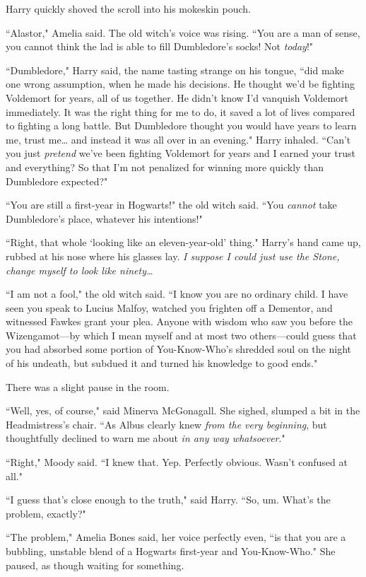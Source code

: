 Harry quickly shoved the scroll into his mokeskin pouch.

``Alastor," Amelia said. The old witch's voice was rising. ``You are a man of sense, you cannot think the lad is able to fill Dumbledore's socks! Not \emph{today}!"

``Dumbledore," Harry said, the name tasting strange on his tongue, ``did make one wrong assumption, when he made his decisions. He thought we'd be fighting Voldemort for years, all of us together. He didn't know I'd vanquish Voldemort immediately. It was the right thing for me to do, it saved a lot of lives compared to fighting a long battle. But Dumbledore thought you would have years to learn me, trust me{\ldots} and instead it was all over in an evening." Harry inhaled. ``Can't you just \emph{pretend} we've been fighting Voldemort for years and I earned your trust and everything? So that I'm not penalized for winning more quickly than Dumbledore expected?"

``You are still a first-year in Hogwarts!" the old witch said. ``You \emph{cannot} take Dumbledore's place, whatever his intentions!"

``Right, that whole `looking like an eleven-year-old' thing." Harry's hand came up, rubbed at his nose where his glasses lay. \emph{I suppose I could just use the Stone, change myself to look like ninety{\ldots}}

``I am not a fool," the old witch said. ``I know you are no ordinary child. I have seen you speak to Lucius Malfoy, watched you frighten off a Dementor, and witnessed Fawkes grant your plea. Anyone with wisdom who saw you before the Wizengamot—by which I mean myself and at most two others—could guess that you had absorbed some portion of You-Know-Who's shredded soul on the night of his undeath, but subdued it and turned his knowledge to good ends."

There was a slight pause in the room.

``Well, yes, of course," said Minerva McGonagall. She sighed, slumped a bit in the Headmistress's chair. ``As Albus clearly knew \emph{from the very beginning}, but thoughtfully declined to warn me about \emph{in any way whatsoever}."

``Right," Moody said. ``I knew that. Yep. Perfectly obvious. Wasn't confused at all."

``I guess that's close enough to the truth," said Harry. ``So, um. What's the problem, exactly?"

``The problem," Amelia Bones said, her voice perfectly even, ``is that you are a bubbling, unstable blend of a Hogwarts first-year and You-Know-Who." She paused, as though waiting for something.

